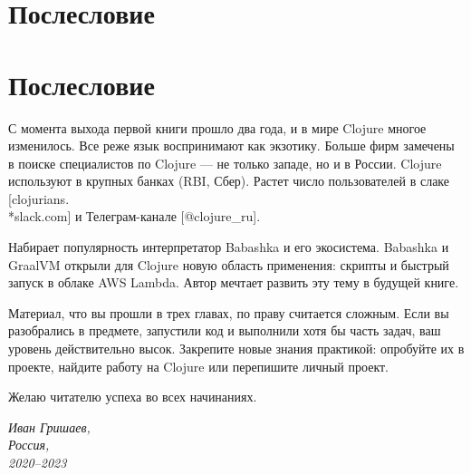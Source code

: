 
\ifprint
\chapter{Послесловие}
\else
\chapter*{Послесловие}
\fi

С момента выхода первой книги прошло два года, и в мире Clojure многое
изменилось. Все реже язык воспринимают как экзотику. Больше фирм замечены в
поиске специалистов по Clojure — не только западе, но и в России. Clojure
используют в крупных банках (RBI, Сбер). Растет число пользователей в слаке
[clojurians.\\*slack.com]
и Телеграм-канале [@clo\-ju\-re\_ru].

Набирает популярность интерпретатор Babashka и его экосистема. Babashka и
GraalVM открыли для Clojure новую область применения: скрипты и быстрый запуск в
облаке AWS Lambda. Автор мечтает развить эту тему в будущей книге.

Материал, что вы прошли в трех главах, по праву считается сложным. Если вы
разобрались в предмете, запустили код и выполнили хотя бы часть задач, ваш
уровень действительно высок. Закрепите новые знания практикой: опробуйте их в
проекте, найдите работу на Clojure или перепишите личный проект.

Желаю читателю успеха во всех начинаниях.

\vspace{1em}

\noindent

\hspace{\fill}\parbox{4cm}{\textit{Иван Гришаев,\\Россия,\\2020--2023}}

